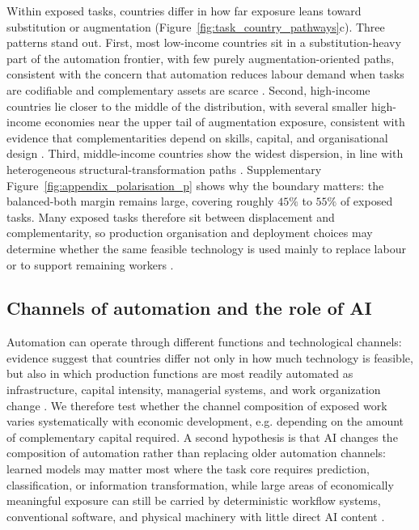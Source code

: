 \documentclass[11pt]{article}
\begin{document}
Within exposed tasks, countries differ in how far exposure leans toward substitution or augmentation (Figure~\ref{fig:task_country_pathways}c). Three patterns stand out. First, most low-income countries sit in a substitution-heavy part of the automation frontier, with few purely augmentation-oriented paths, consistent with the concern that automation reduces labour demand when tasks are codifiable and complementary assets are scarce \citep{AcemogluRestrepo2018}. Second, high-income countries lie closer to the middle of the distribution, with several smaller high-income economies near the upper tail of augmentation exposure, consistent with evidence that complementarities depend on skills, capital, and organisational design \citep{BresnahanBrynjolfssonHitt2002,RaischKrakowski2021AutomationAugmentation}. Third, middle-income countries show the widest dispersion, in line with heterogeneous structural-transformation paths \citep{Rodrik2016PrematureDeindustrializationJEG,CaunedoKellerShin2021,LewandowskiMadonPark2025DevelopmentStages}. Supplementary Figure~\ref{fig:appendix_polarisation_p} shows why the boundary matters: the balanced-both margin remains large, covering roughly $45\%$ to $55\%$ of exposed tasks. Many exposed tasks therefore sit between displacement and complementarity, so production organisation and deployment choices may determine whether the same feasible technology is used mainly to replace labour or to support remaining workers \citep{RaischKrakowski2021AutomationAugmentation,BrynjolfssonLiRaymond2023GenerativeAIatWork,DellAcquaEtAl2026JaggedFrontier}.


\FloatBarrier
\subsection{Channels of automation and the role of AI}
\label{sec:results_channels_ai}

Automation can operate through different functions and technological channels: evidence suggest that countries differ not only in how much technology is feasible, but also in which production functions are most readily automated as infrastructure, capital intensity, managerial systems, and work organization change \citep{CominHobijn2010,LewandowskiMadonPark2025DevelopmentStages}. We therefore test whether the channel composition of exposed work varies systematically with economic development, e.g. depending on the amount of complementary capital required. A second hypothesis is that AI changes the composition of automation rather than replacing older automation channels: learned models may matter most where the task core requires prediction, classification, or information transformation, while large areas of economically meaningful exposure can still be carried by deterministic workflow systems, conventional software, and physical machinery with little direct AI content \citep{SvanbergLiFlemingGoehringThompson2024}.
\end{document}
